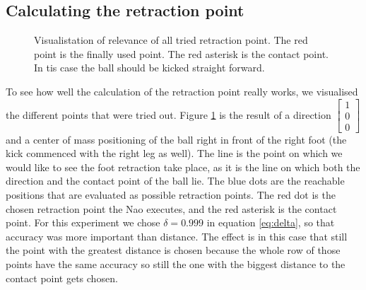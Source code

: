 \documentclass[a4paper]{article}
\begin{document}
\subsection{Calculating the retraction point}
\begin{figure}[htbp]
  \centering
  \caption{Visualistation of relevance of all tried retraction point. The red
      point is the finally used point. The red asterisk is the contact point. In
      tis case the ball should be kicked straight forward.
         }
  \label{fig:retraction_plot1}
\end{figure}
\FloatBarrier
To see how well the calculation of the retraction point really works, we
visualised the different points that were tried out. Figure \ref{fig:retraction_plot1}
is the result of a direction 
$\begin{bmatrix} 1 \\  0 \\ 0 \end{bmatrix}$ and a center of mass positioning of
    the ball right in front of the right foot (the kick commenced with the right
    leg as well). The line is the point on which we
    would like to see the foot retraction take place, as it is the line on which
    both the direction and the contact point of the ball lie. The blue dots are
    the reachable positions that are evaluated as possible retraction points. The red dot is the
    chosen retraction point the Nao executes, and the red asterisk is the contact
    point. For this experiment we chose 
    $\delta = 0.999$ in equation \ref{eq:delta}, so that accuracy was more important than distance. The
    effect is in this case that still the point with the greatest distance is
    chosen because the whole row of those points have the same accuracy so still
    the one with the biggest distance to the contact point gets chosen.
\end{document}
